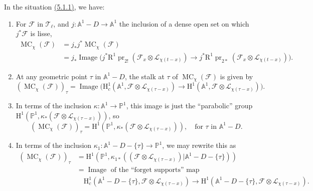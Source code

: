 In the situation \hyperref[par:5.1.1]{(5.1.1)}, we have:
\begin{enumerate}[label=(\arabic*)]
\item For \(\mathcal{F}\) in \(\mathcal{T}_\ell\), and
\(j:\mathbb{A}^1-D\to\mathbb{A}^1\) the inclusion of a dense open set on which
\(j^*\mathcal{F}\) is lisse,
\[
\begin{aligned}
  \operatorname{MC}_\chi(\mathcal{F})
  &=j_*j^*\operatorname{MC}_\chi(\mathcal{F})\\
  &=j_*\operatorname{Image}\bigl(
  j^*\mathrm{R}^1\operatorname{pr}_{2!}(\mathcal{F}_x\otimes\mathcal{L}_{\chi(t-x)})
  \to
  j^*\mathrm{R}^1\operatorname{pr}_{2*}(\mathcal{F}_x\otimes\mathcal{L}_{\chi(t-x)})
  \bigr).
\end{aligned}
\]

\item At any geometric point \(\tau\) in \(\mathbb{A}^1-D\), the stalk at
\(\tau\) of \(\operatorname{MC}_\chi(\mathcal{F})\) is given by
\[
  (\operatorname{MC}_\chi(\mathcal{F}))_\tau
  =\operatorname{Image}\bigl(
  \mathrm{H}^1_c(\mathbb{A}^1,\mathcal{F}\otimes\mathcal{L}_{\chi(\tau-x)})
  \to
  \mathrm{H}^1(\mathbb{A}^1,\mathcal{F}\otimes\mathcal{L}_{\chi(\tau-x)})
  \bigr).
\]

\item In terms of the inclusion \(\kappa:\mathbb{A}^1\to\mathbb{P}^1\), this
image is just the ``parabolic'' group
\(\mathrm{H}^1(\mathbb{P}^1,\kappa_*(\mathcal{F}\otimes\mathcal{L}_{\chi(\tau-x)}))\),
so
\[
  (\operatorname{MC}_\chi(\mathcal{F}))_\tau
  =\mathrm{H}^1(\mathbb{P}^1,\kappa_*(\mathcal{F}\otimes\mathcal{L}_{\chi(\tau-x)})),
  \quad\text{for \(\tau\) in \(\mathbb{A}^1-D\)}.
\]

\item In terms of the inclusion
\(\kappa_1:\mathbb{A}^1-D-\{\tau\}\to\mathbb{P}^1\), we may rewrite this as
\[
\begin{aligned}
  (\operatorname{MC}_\chi(\mathcal{F}))_\tau
  &=
  \mathrm{H}^1(\mathbb{P}^1,\kappa_{1*}((\mathcal{F}\otimes
  \mathcal{L}_{\chi(\tau-x)})\vert\mathbb{A}^1-D-\{\tau\}))\\
  &=
  \operatorname{Image}\text{ of the ``forget supports'' map}\\
  &\quad
  \mathrm{H}^1_c(\mathbb{A}^1-D-\{\tau\},
  \mathcal{F}\otimes\mathcal{L}_{\chi(\tau-x)})
  \to
  \mathrm{H}^1(\mathbb{A}^1-D-\{\tau\},
  \mathcal{F}\otimes\mathcal{L}_{\chi(\tau-x)}).
\end{aligned}
\]
\end{enumerate}

